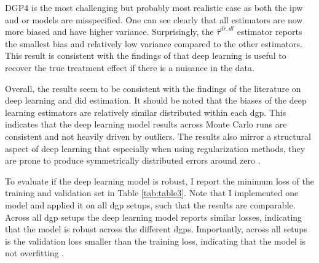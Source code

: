 DGP4 is the most challenging but probably most realistic case as both the \ac{ipw} and \ac{or} models are misspecified.
One can see clearly that all estimators are now more biased and have higher variance.
Surprisingly, the $\hat{\tau}^{dr,dl}$ estimator reports the smallest bias and relatively low variance compared to the other estimators.
This result is consistent with the findings of \citet{belloni2017program,chernozhukovDoubleDebiasedMachine2018,farrellDeepNeuralNetworks2021} that deep learning is useful to recover the true treatment effect if there is a nuisance in the data.



Overall, the results seem to be consistent with the findings of the literature on deep learning and \ac{did} estimation.
It should be noted that the biases of the deep learning estimators are relatively similar distributed within each \ac{dgp}.
This indicates that the deep learning model results across Monte Carlo runs are consistent and not heavily driven by outliers.
The results also mirror a structural aspect of deep learning that especially when using regularization methods, they are prone to produce symmetrically distributed errors around zero \citep{koh2017understanding}.

To evaluate if the deep learning model is robust, I report the minimum loss of the training and validation set in Table \ref{tab:table3}.
Note that I implemented one model and applied it on all \ac{dgp} setups, such that the results are comparable.
Across all \ac{dgp} setups the deep learning model reports similar losses, indicating that the model is robust across the different \ac{dgp}s.
Importantly, across all setups is the validation loss smaller than the training loss, indicating that the model is not overfitting \citep[see][]{Goodfellow-et-al-2016,farrellDeepNeuralNetworks2021}.





